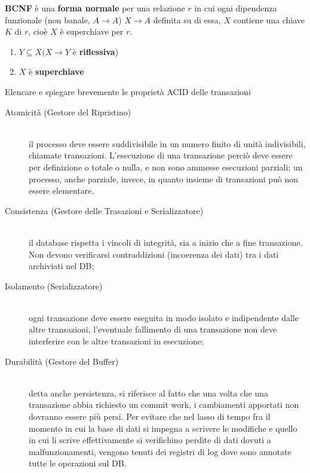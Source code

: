 \documentclass{exam}
\begin{document}
\begin{questions}
\begin{solution}
        \textbf{BCNF} è una \textbf{forma normale} per una relazione $r$ in cui ogni dipendenza funzionale (non banale, $A \rightarrow A$)
        $X \rightarrow A$ definita su di essa, $X$ contiene una chiave $K$ di $r$, cioè $X$ è superchiave per $r$.
        \begin{enumerate}
            \item $Y \subseteq X (X \rightarrow Y$ è \textbf{riflessiva})
            \item $X$ è \textbf{superchiave}
        \end{enumerate}
    \end{solution}
    \question Elencare e spiegare brevemente le proprietà ACID delle transazioni
    \begin{solution}
        \begin{description}
            \item[Atomicità (Gestore del Ripristino)] \hfill \\ il processo deve essere suddivisibile in un numero finito di unità indivisibili, chiamate transazioni. L'esecuzione di una transazione perciò deve essere per definizione o totale o nulla, e non sono ammesse esecuzioni parziali; un processo, anche parziale, invece, in quanto insieme di transazioni può non essere elementare.
            \item[Consistenza (Gestore delle Trasazioni e Serializzatore)] \hfill \\ il database rispetta i vincoli di integrità, sia a inizio che a fine transazione. Non devono verificarsi contraddizioni (incoerenza dei dati) tra i dati archiviati nel DB;
            \item[Isolamento (Serializzatore)] \hfill \\ ogni transazione deve essere eseguita in modo isolato e indipendente dalle altre transazioni, l'eventuale fallimento di una transazione non deve interferire con le altre transazioni in esecuzione;
            \item[Durabilità (Gestore del Buffer)] \hfill \\ detta anche persistenza, si riferisce al fatto che una volta che una transazione abbia richiesto un commit work, i cambiamenti apportati non dovranno essere più persi. Per evitare che nel lasso di tempo fra il momento in cui la base di dati si impegna a scrivere le modifiche e quello in cui li scrive effettivamente si verifichino perdite di dati dovuti a malfunzionamenti, vengono tenuti dei registri di log dove sono annotate tutte le operazioni sul DB.
          \end{description}

\end{solution}
\end{questions}
\end{document}

